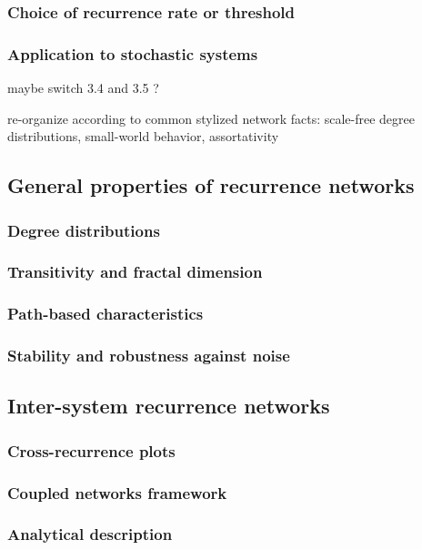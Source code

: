 		\subsubsection{Choice of recurrence rate or threshold}
		\subsubsection{Application to stochastic systems}

maybe switch 3.4 and 3.5 ?

re-organize according to common stylized network facts: scale-free degree
distributions, small-world behavior, assortativity 

	\subsection{General properties of recurrence networks}
		\subsubsection{Degree distributions}
		\subsubsection{Transitivity and fractal dimension}
		\subsubsection{Path-based characteristics}
		\subsubsection{Stability and robustness against noise}

	\subsection{Inter-system recurrence networks}
		\subsubsection{Cross-recurrence plots}
		\subsubsection{Coupled networks framework}
		\subsubsection{Analytical description}
